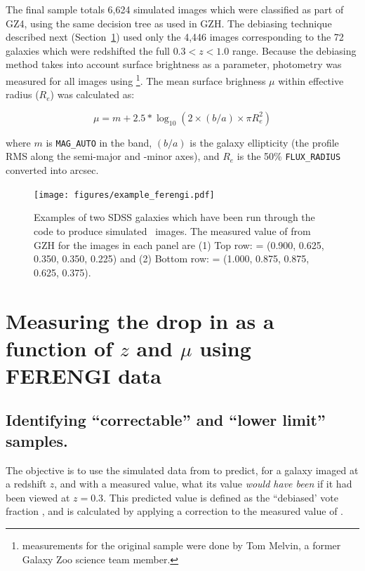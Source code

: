 The final \ferengi{} sample totals 6,624 simulated images which were classified as part of GZ4, using the same decision tree as used in GZH. The debiasing technique described next (Section~\ref{sec:ferengidebiasing}) used only the 4,446 images corresponding to the 72 galaxies which were redshifted the full $0.3<z<1.0$ range. Because the debiasing method takes into account surface brightness as a parameter, photometry was measured for all images using \sextractor{} \footnote{\sextractor{} measurements for the original \ferengi{} sample were done by Tom Melvin, a former Galaxy Zoo science team member.}. The mean surface brighness $\mu$ within effective radius ($R_{e}$) was calculated as:

\begin{equation}
\label{eqn:mu}
\mu = m + 2.5*\log_{10}{(2 \times (b/a) \times \pi R_e^2 )}
\end{equation}

where $m$ is {\tt MAG\_AUTO} in the \Iband{} band, $(b/a)$ is the galaxy
ellipticity (the profile RMS along the semi-major and -minor axes), and $R_e$
is the 50\% {\tt FLUX\_RADIUS} converted into arcsec.


 

\begin{figure}
\centering
\texttt{[image: figures/example\_ferengi.pdf]}
\caption{Examples of two SDSS galaxies which have been run through the \ferengi{} code to produce simulated \hst~images. The measured value of \ffeatures{} from GZH for the images in each panel are (1) Top row: \ffeatures{} = (0.900, 0.625, 0.350, 0.350, 0.225) and (2) Bottom row: \ffeatures{} = (1.000, 0.875, 0.875, 0.625, 0.375).}
\label{fig:ferengi1_examples}
\end{figure}



\section{Measuring the drop in \ffeatures{} as a function of $z$ and $\mu$ using FERENGI data}
\label{sec:ferengidebiasing}
\subsection{Identifying ``correctable'' and ``lower limit'' samples.}
\label{ssec:correctablesamples}

The objective is to use the simulated data from \ferengi{} to predict, for a galaxy imaged at a redshift $z$, and with a measured \ffeaturesz{} value, what its \ffeatures{} value \emph{would have been} if it had been viewed at $z=0.3$. This predicted value is defined as the ``debiased' vote fraction \ffeaturesdebiased, and is calculated by applying a correction to the measured value of \ffeatures.

